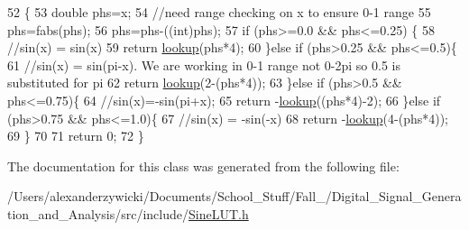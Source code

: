 \begin{DoxyCode}
52                                                           \{
53             \textcolor{keywordtype}{double} phs=x;
54             \textcolor{comment}{//need range checking on x to ensure 0-1 range}
55             phs=fabs(phs);
56             phs=phs-((int)phs);
57             \textcolor{keywordflow}{if} (phs>=0.0 && phs<=0.25) \{
58                 \textcolor{comment}{//sin(x) = sin(x)}
59                 \textcolor{keywordflow}{return} \hyperlink{class_backend_1_1_small_sine_l_u_t_ab4403a4852d61cef8199a3f2cb313c57}{lookup}(phs*4);
60             \}\textcolor{keywordflow}{else} \textcolor{keywordflow}{if} (phs>0.25 && phs<=0.5)\{
61                 \textcolor{comment}{//sin(x) =      sin(pi-x). We are working in 0-1 range not 0-2pi so 0.5 is substituted for
       pi}
62                 \textcolor{keywordflow}{return} \hyperlink{class_backend_1_1_small_sine_l_u_t_ab4403a4852d61cef8199a3f2cb313c57}{lookup}(2-(phs*4));
63             \}\textcolor{keywordflow}{else} \textcolor{keywordflow}{if} (phs>0.5 && phs<=0.75)\{
64                 \textcolor{comment}{//sin(x)=-sin(pi+x);}
65                 \textcolor{keywordflow}{return} -\hyperlink{class_backend_1_1_small_sine_l_u_t_ab4403a4852d61cef8199a3f2cb313c57}{lookup}((phs*4)-2);
66             \}\textcolor{keywordflow}{else} \textcolor{keywordflow}{if} (phs>0.75 && phs<=1.0)\{
67                 \textcolor{comment}{//sin(x) = -sin(-x)}
68                 \textcolor{keywordflow}{return} -\hyperlink{class_backend_1_1_small_sine_l_u_t_ab4403a4852d61cef8199a3f2cb313c57}{lookup}(4-(phs*4));
69             \}
70             
71             \textcolor{keywordflow}{return} 0;
72         \}
\end{DoxyCode}


The documentation for this class was generated from the following file\+:\begin{DoxyCompactItemize}
\item 
/\+Users/alexanderzywicki/\+Documents/\+School\+\_\+\+Stuff/\+Fall\+\_/\+Digital\+\_\+\+Signal\+\_\+\+Generation\+\_\+and\+\_\+\+Analysis/src/include/\hyperlink{_sine_l_u_t_8h}{Sine\+L\+U\+T.\+h}\end{DoxyCompactItemize}
